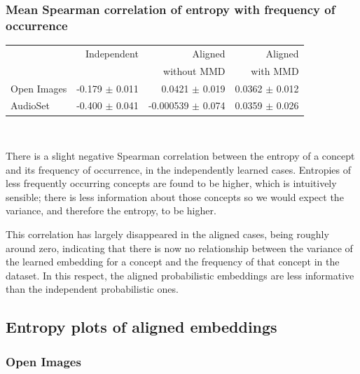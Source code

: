 \subsubsection{Mean Spearman correlation of entropy with frequency of occurrence}
\begin{table}[H]
\centering
\begin{tabular}{lrrr}
\toprule
       &   Independent & Aligned     &  Aligned  \\
       &               & without MMD &  with MMD \\
\midrule
Open Images    &  -0.179 $\pm$ 0.011 & 0.0421 $\pm$ 0.019 &     0.0362 $\pm$  0.012 \\
AudioSet    &  -0.400 $\pm$ 0.041 & -0.000539 $\pm$   0.074 &      0.0359  $\pm$ 0.026  \\
\bottomrule
\end{tabular}\\
\end{table}
There is a slight negative Spearman correlation between the entropy of a concept and its frequency of occurrence, in the independently learned cases. Entropies of less frequently occurring concepts are found to be higher, which is intuitively sensible; there is less information about those concepts so we would expect the variance, and therefore the entropy, to be higher. 

This correlation has largely disappeared in the aligned cases, being roughly around zero, indicating that there is now no relationship between the variance of the learned embedding for a concept and the frequency of that concept in the dataset. In this respect, the aligned probabilistic embeddings are less informative than the independent probabilistic ones. 
\subsection{Entropy plots of aligned embeddings}


\subsubsection{Open Images}


